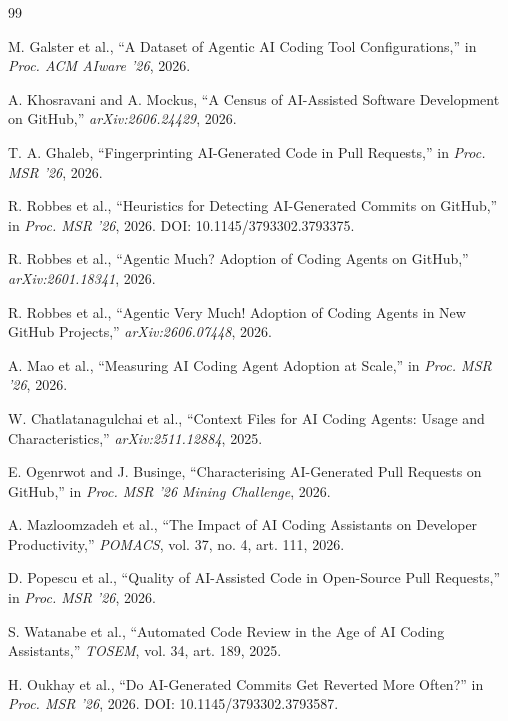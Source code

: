 \documentclass[11pt,a4paper]{article}
\begin{document}
\begin{thebibliography}{99}

M. Galster et al.,
``A Dataset of Agentic AI Coding Tool Configurations,''
in \textit{Proc. ACM AIware '26}, 2026.

A. Khosravani and A. Mockus,
``A Census of AI-Assisted Software Development on GitHub,''
\textit{arXiv:2606.24429}, 2026.

T. A. Ghaleb,
``Fingerprinting AI-Generated Code in Pull Requests,''
in \textit{Proc. MSR '26}, 2026.

R. Robbes et al.,
``Heuristics for Detecting AI-Generated Commits on GitHub,''
in \textit{Proc. MSR '26}, 2026. DOI: 10.1145/3793302.3793375.

R. Robbes et al.,
``Agentic Much? Adoption of Coding Agents on GitHub,''
\textit{arXiv:2601.18341}, 2026.

R. Robbes et al.,
``Agentic Very Much! Adoption of Coding Agents in New GitHub Projects,''
\textit{arXiv:2606.07448}, 2026.

A. Mao et al.,
``Measuring AI Coding Agent Adoption at Scale,''
in \textit{Proc. MSR '26}, 2026.

W. Chatlatanagulchai et al.,
``Context Files for AI Coding Agents: Usage and Characteristics,''
\textit{arXiv:2511.12884}, 2025.

E. Ogenrwot and J. Businge,
``Characterising AI-Generated Pull Requests on GitHub,''
in \textit{Proc. MSR '26 Mining Challenge}, 2026.

A. Mazloomzadeh et al.,
``The Impact of AI Coding Assistants on Developer Productivity,''
\textit{POMACS}, vol. 37, no. 4, art. 111, 2026.

D. Popescu et al.,
``Quality of AI-Assisted Code in Open-Source Pull Requests,''
in \textit{Proc. MSR '26}, 2026.

S. Watanabe et al.,
``Automated Code Review in the Age of AI Coding Assistants,''
\textit{TOSEM}, vol. 34, art. 189, 2025.

H. Oukhay et al.,
``Do AI-Generated Commits Get Reverted More Often?''
in \textit{Proc. MSR '26}, 2026. DOI: 10.1145/3793302.3793587.


\end{thebibliography}
\end{document}
